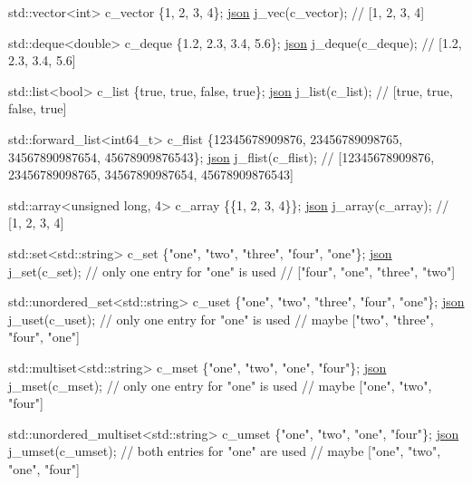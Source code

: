 \begin{DoxyCode}
std::vector<int> c\_vector \{1, 2, 3, 4\};
\hyperlink{a00025}{json} j\_vec(c\_vector);
\textcolor{comment}{// [1, 2, 3, 4]}

std::deque<double> c\_deque \{1.2, 2.3, 3.4, 5.6\};
\hyperlink{a00025}{json} j\_deque(c\_deque);
\textcolor{comment}{// [1.2, 2.3, 3.4, 5.6]}

std::list<bool> c\_list \{\textcolor{keyword}{true}, \textcolor{keyword}{true}, \textcolor{keyword}{false}, \textcolor{keyword}{true}\};
\hyperlink{a00025}{json} j\_list(c\_list);
\textcolor{comment}{// [true, true, false, true]}

std::forward\_list<int64\_t> c\_flist \{12345678909876, 23456789098765, 34567890987654, 45678909876543\};
\hyperlink{a00025}{json} j\_flist(c\_flist);
\textcolor{comment}{// [12345678909876, 23456789098765, 34567890987654, 45678909876543]}

std::array<unsigned long, 4> c\_array \{\{1, 2, 3, 4\}\};
\hyperlink{a00025}{json} j\_array(c\_array);
\textcolor{comment}{// [1, 2, 3, 4]}

std::set<std::string> c\_set \{\textcolor{stringliteral}{"one"}, \textcolor{stringliteral}{"two"}, \textcolor{stringliteral}{"three"}, \textcolor{stringliteral}{"four"}, \textcolor{stringliteral}{"one"}\};
\hyperlink{a00025}{json} j\_set(c\_set); \textcolor{comment}{// only one entry for "one" is used}
\textcolor{comment}{// ["four", "one", "three", "two"]}

std::unordered\_set<std::string> c\_uset \{\textcolor{stringliteral}{"one"}, \textcolor{stringliteral}{"two"}, \textcolor{stringliteral}{"three"}, \textcolor{stringliteral}{"four"}, \textcolor{stringliteral}{"one"}\};
\hyperlink{a00025}{json} j\_uset(c\_uset); \textcolor{comment}{// only one entry for "one" is used}
\textcolor{comment}{// maybe ["two", "three", "four", "one"]}

std::multiset<std::string> c\_mset \{\textcolor{stringliteral}{"one"}, \textcolor{stringliteral}{"two"}, \textcolor{stringliteral}{"one"}, \textcolor{stringliteral}{"four"}\};
\hyperlink{a00025}{json} j\_mset(c\_mset); \textcolor{comment}{// only one entry for "one" is used}
\textcolor{comment}{// maybe ["one", "two", "four"]}

std::unordered\_multiset<std::string> c\_umset \{\textcolor{stringliteral}{"one"}, \textcolor{stringliteral}{"two"}, \textcolor{stringliteral}{"one"}, \textcolor{stringliteral}{"four"}\};
\hyperlink{a00025}{json} j\_umset(c\_umset); \textcolor{comment}{// both entries for "one" are used}
\textcolor{comment}{// maybe ["one", "two", "one", "four"]}
\end{DoxyCode}



